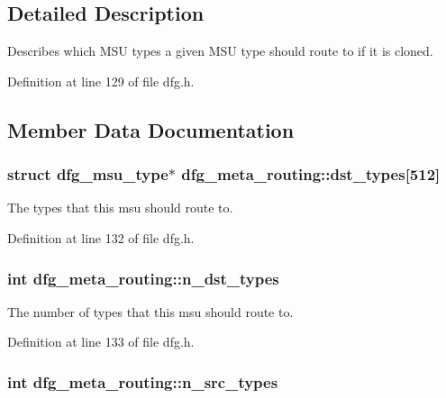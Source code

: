 \subsection{Detailed Description}
Describes which M\-S\-U types a given M\-S\-U type should route to if it is cloned. 

Definition at line 129 of file dfg.\-h.



\subsection{Member Data Documentation}
\hypertarget{structdfg__meta__routing_a33011fd118a329e61f37c05a6d094f7d}{
\subsubsection[{dst\-\_\-types}]{\setlength{\rightskip}{0pt plus 5cm}struct {\bf dfg\-\_\-msu\-\_\-type}$\ast$ dfg\-\_\-meta\-\_\-routing\-::dst\-\_\-types\mbox{[}512\mbox{]}}}\label{structdfg__meta__routing_a33011fd118a329e61f37c05a6d094f7d}


The types that this msu should route to. 



Definition at line 132 of file dfg.\-h.

\hypertarget{structdfg__meta__routing_a70780c9f090459860034252dfa139808}{
\subsubsection[{n\-\_\-dst\-\_\-types}]{\setlength{\rightskip}{0pt plus 5cm}int dfg\-\_\-meta\-\_\-routing\-::n\-\_\-dst\-\_\-types}}\label{structdfg__meta__routing_a70780c9f090459860034252dfa139808}


The number of types that this msu should route to. 



Definition at line 133 of file dfg.\-h.

\hypertarget{structdfg__meta__routing_adb2586e29348fe1efe970f56cfe4a789}{
\subsubsection[{n\-\_\-src\-\_\-types}]{\setlength{\rightskip}{0pt plus 5cm}int dfg\-\_\-meta\-\_\-routing\-::n\-\_\-src\-\_\-types}}\label{structdfg__meta__routing_adb2586e29348fe1efe970f56cfe4a789}


